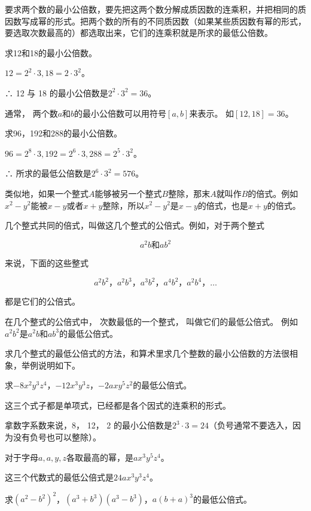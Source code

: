 要求两个数的最小公倍数，要先把这两个数分解成质因数的连乘积，并把相同的质因数写成幂的形式。把两个数的所有的不同质因数（如果某些质因数有幂的形式，要选取次数最高的）都选取出来，它们的连乘积就是所求的最低公倍数。

 求12和18的最小公倍数。

\(12 = 2^{2} \cdot 3, 18 = 2 \cdot 3^{2}\)。

∴ 12 与 18 的最小公倍数是\(2^{2} \cdot 3^{2} = 36\)。

通常， 两个数\(a\)和\(b\)的最小公倍数可以用符号\([a, b]\)来表示。
如\([12, 18] = 36\)。

 求96，192和288的最小公倍数。

\(96 = 2^{8} \cdot 3, 192 = 2^{6} \cdot 3, 288 = 2^{5} \cdot 3^{2}\)。

∴ 所求的最低公倍数是\(2^{6} \cdot 3^{2} = 576\)。

类似地，如果一个整式\(A\)能够被另一个整式\(B\)整除，那末\(A\)就叫作\(B\)的倍式。例如\(x^{2} - y^{2}\)能被\(x - y\)或者\(x + y\)整除，所以\(x^{2} - y^{2}\)是\(x - y\)的倍式，也是\(x + y\)的倍式。

几个整式共同的倍式，叫做这几个整式的公倍式。例如，对于两个整式

\[
a ^{2} b \text{和} a b ^{2}
\]

来说，下面的这些整式

\[
a ^{2} b ^{2}\text{，} a ^{2} b ^{3}\text{，} a ^{3} b ^{2}\text{，} a ^{4} b ^{2}\text{，} a ^{2} b ^{4}\text{，} \dots
\]

都是它们的公倍式。

在几个整式的公倍式中， 次数最低的一个整式， 叫做它们的最低公倍式。
例如\(a^2 b^2\)是\(a^2 b\)和\(a b^3\)的最低公倍式。

求几个整式的最低公倍式的方法，和算术里求几个整数的最小公倍数的方法很相象，举例说明如下。

求\(-8x^{2}y^{3}z^{4}\)，\(-12x^{3}y^{3}z\)，\(-2axy^{5}z^{2}\)的最低公倍式。

 这三个式子都是单项式，已经都是各个因式的连乘积的形式。

拿数字系数来说，8， 12， 2
的最小公倍数是\(2^{3} \cdot 3 = 24\)（负号通常不要选入，因为没有负号也可以整除）。

对于字母\(a, a, y, z\)各取最高的幂，是\(ax^3y^5z^4\)。

 这三个代数式的最低公倍式是\(24ax^{3}y^{3}z^{4}\)。

求\((a^{2}-b^{2})^{2}\)，\((a^{3}+b^{3})(a^{3}-b^{3})\)，\(a(b+a)^{3}\)的最低公倍式。

